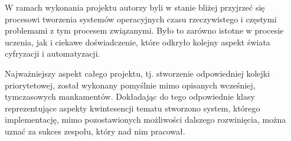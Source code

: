\documentclass[12pt, a4paper]{article}
\begin{document}
W ramach wykonania projektu autorzy byli w stanie bliżej przyjrzeć się procesowi tworzenia systemów operacyjnych czasu rzeczywistego i częstymi problemami z tym procesem 
związanymi. Było to zarówno istotne w procesie uczenia, jak i ciekawe doświadczenie, które odkryło kolejny aspekt świata cyfryzacji i automatyzacji.

Najważniejszy aspekt całego projektu, tj. stworzenie odpowiedniej kolejki priorytetowej, został wykonany pomyślnie mimo opisanych wcześniej, tymczasowych mankamentów.
Dokładając do tego odpowiednie klasy reprezentujące aspekty kwintesencji tematu stworzono system, którego implementację, mimo pozostawionych możliwości dalszego rozwinięcia, 
można uznać za sukces zespołu, który nad nim pracował.
\end{document}
